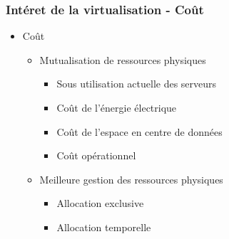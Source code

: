   \begin{frame}
    \frametitle{Intéret de la virtualisation - Coût}
    \begin{itemize}
      \item Coût
      \begin{itemize}
        \item Mutualisation de ressources physiques
        \begin{itemize}
          \item Sous utilisation actuelle des serveurs
          \item Coût de l'énergie électrique 
          \item Coût de l'espace en centre de données
          \item Coût opérationnel\pause
        \end{itemize}
        \item Meilleure gestion des ressources physiques
        \begin{itemize}
          \item Allocation exclusive
          \item Allocation temporelle
        \end{itemize}
      \end{itemize}
    \end{itemize}
  \end{frame}
  
